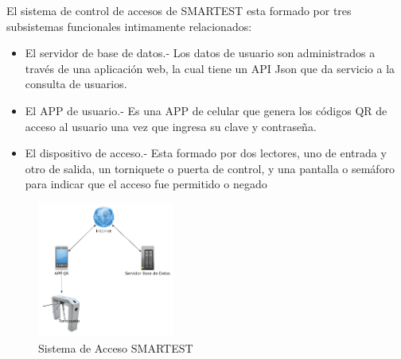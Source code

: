 El sistema de control de accesos de SMARTEST esta formado por tres subsistemas funcionales intimamente relacionados:

\begin{itemize}
\item El servidor de base de datos.- Los datos de usuario son administrados a través de una aplicación web, la cual tiene un API Json que da servicio a la consulta de usuarios.
\item El APP de usuario.- Es una APP de celular que genera los códigos QR de acceso al usuario una vez que ingresa su clave y contraseña.
\item El dispositivo de acceso.- Esta formado por dos lectores, uno de entrada y otro de salida, un torniquete o puerta de control, y una pantalla o semáforo para indicar que el acceso fue permitido o negado
\end{itemize}

\begin{figure}[htb]
\centering
\includegraphics[width=0.4\textwidth]{capitulo1/sistema_acceso.png}
\caption{Sistema de Acceso SMARTEST}
\label{cap1:001}
\end{figure}
